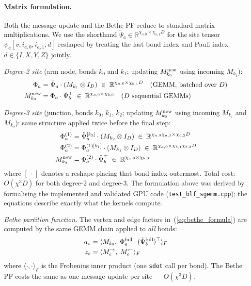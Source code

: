 \documentclass[12pt]{article}
\begin{document}
\paragraph{Matrix formulation.}
Both the message update and the Bethe PF reduce to standard matrix
multiplications.
We use the shorthand $\tilde{\Psi}_a \in \mathbb{R}^{\chi_{a,0} \times \chi_{a,1}D}$
for the site tensor $\psi_a[v, i_{a,0}, i_{a,1}, d]$ reshaped by treating
the last bond index and Pauli index $d\in\{I,X,Y,Z\}$ jointly.

\textit{Degree-2 site} (arm node, bonds $k_0$ and $k_1$; updating $M_{k_0}^{\rm new}$
using incoming $M_{k_1}$):
\begin{align}
    \Phi_a &= \tilde{\Psi}_a \cdot (M_{k_1} \otimes I_D)
    \;\in\; \mathbb{R}^{\chi_{a,0} \times \chi_{b,1}D}
    \quad\text{(GEMM, batched over }D\text{)}
    \label{eq:gemm1}\\
    M_{k_0}^{\rm new} &= \Phi_a \cdot \tilde{\Psi}_b^{\top}
    \;\in\; \mathbb{R}^{\chi_{a,0} \times \chi_{b,0}}
    \quad\text{($D$ sequential GEMMs)}
    \label{eq:gemm2}
\end{align}

\textit{Degree-3 site} (junction, bonds $k_0$, $k_1$, $k_2$; updating $M_{k_0}^{\rm new}$
using incoming $M_{k_1}$ and $M_{k_2}$):
same structure applied twice before the final step:
\begin{align}
    \Phi_a^{(1)} &= \tilde{\Psi}_a^{[k_2]} \cdot (M_{k_2}\otimes I_D)
    \;\in\; \mathbb{R}^{\chi_{a,0}\chi_{a,1}\times\chi_{b,2}D}
    \label{eq:gemm3}\\
    \Phi_a^{(2)} &= \Phi_a^{(1)[k_1]} \cdot (M_{k_1}\otimes I_D)
    \;\in\; \mathbb{R}^{\chi_{a,0}\times\chi_{b,1}\chi_{b,2}D}
    \label{eq:gemm4}\\
    M_{k_0}^{\rm new} &= \Phi_a^{(2)} \cdot \tilde{\Psi}_b^{\top}
    \;\in\; \mathbb{R}^{\chi_{a,0}\times\chi_{b,0}}
    \label{eq:gemm5}
\end{align}
where $[\,\cdot\,]$ denotes a reshape placing that bond index outermost.
Total cost: $O(\chi^3 D)$ for both degree-2 and degree-3.
The formulation above was derived by formalising the implemented and
validated GPU code (\texttt{test\_blf\_sgemm.cpp}); the equations
describe exactly what the kernels compute.

\textit{Bethe partition function.}
The vertex and edge factors in~(\ref{eq:bethe_formula}) are computed
by the same GEMM chain applied to \emph{all} bonds:
\begin{align}
    a_v &= \langle M_{k_0},\;
           \Phi_a^{\rm full} \cdot (\tilde{\Psi}_b^{\rm full})^{\top}
           \rangle_F
    \label{eq:bethe_v}\\
    z_e &= \langle M_e^{\to},\; M_e^{\leftarrow}\rangle_F
    \label{eq:bethe_e}
\end{align}
where $\langle\cdot,\cdot\rangle_F$ is the Frobenius inner product
(one \texttt{sdot} call per bond).
The Bethe PF costs the same as one message update per site — $O(\chi^3 D)$.
\end{document}
